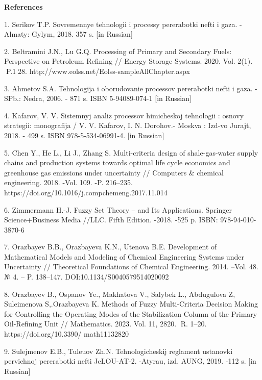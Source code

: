 \begin{center}
    {\bfseries References}
\end{center}

\begin{noparindent}

1. Serikov T.P. Sovremennye tehnologii i processy pererabotki nefti i
gaza. - Almaty: Gylym, 2018. 357 s. {[}in Russian{]}

2. Beltramini J.N., Lu G.Q. Processing of Primary and Secondary Fuels:
Perspective on Petroleum Refining // Energy Storage Systems. 2020. Vol.
2(1). P.128. http://www.eolss.net/Eolss-sampleAllChapter.aspx

3. Ahmetov S.A. Tehnologija i oborudovanie processov pererabotki nefti i
gaza. - SPb.: Nedra, 2006. - 871 s. ISBN 5-94089-074-1 {[}in Russian{]}

4. Kafarov, V. V. Sistemnyj analiz processov himicheskoj tehnologii :
osnovy strategii: monografija / V. V. Kafarov, I. N. Dorohov.- Moskva :
Izd-vo Jurajt, 2018. - 499 s. ISBN 978-5-534-06991-4. {[}in Russian{]}

5. Chen Y., He L., Li J., Zhang S. Multi-criteria design of
shale-gas-water supply chains and production systems towards optimal
life cycle economics and greenhouse gas emissions under uncertainty //
Computers \& chemical engineering. 2018. -Vol. 109. -P. 216--235.
https://doi.org/10.1016/j.compchemeng.2017.11.014

6. Zimmermann H.-J. Fuzzy Set Theory -- and Its Applications. Springer
Science+Business Media //LLC. Fifth Edition. -2018. -525 p. ISBN:
978-94-010-3870-6

7. Orazbayev B.B., Orazbayeva K.N., Utenova B.E. Development of
Mathematical Models and Modeling of Chemical Engineering Systems under
Uncertainty // Theoretical Foundations of Chemical Engineering. 2014.
--Vol. 48. № 4. -- P. 138--147. DOI:10.1134/S0040579514020092

8. Orazbayev B., Ospanov Ye., Makhatova V., Salybek L., Abdugulova Z,
Suleimenova S,.Orazbayeva K. Methods of Fuzzy Multi-Criteria Decision
Making for Controlling the Operating Modes of the Stabilization Column
of the Primary Oil-Refining Unit // Mathematics. 2023. Vol. 11, 2820.
R. 1--20. \\https://doi.org/10.3390/ math11132820

9. Sulejmenov E.B., Tuleuov Zh.N. Tehnologicheskij reglament ustanovki
pervichnoj pererabotki nefti JeLOU-AT-2. -Atyrau, izd. AUNG, 2019. -112
s. {[}in Russian{]}


\end{noparindent}
